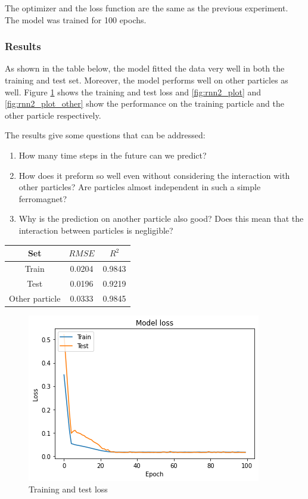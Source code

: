 \documentclass[a4paper]{article}
\begin{document}
  The optimizer and the loss function are the same as the previous experiment. The model was trained for 100 epochs.

  \subsubsection{Results}
  As shown in the table below, the model fitted the data very well in both the training and test set. Moreover, the model performs well on other particles as well. Figure \ref{fig:rnn2_loss} shows the training and test loss and \ref{fig:rnn2_plot} and \ref{fig:rnn2_plot_other} show the performance on the training particle and the other particle respectively.

  The results give some questions that can be addressed:

  \begin{enumerate}
    \item How many time steps in the future can we predict?
    \item How does it preform so well even without considering the interaction with other particles? Are particles almost independent in such a simple ferromagnet?
    \item Why is the prediction on another particle also good? Does this mean that the interaction between particles is negligible?
  \end{enumerate}

  \begin{table}[h!]
    \centering
    \begin{tabular}{|c | c c|} 
     \hline
     Set & $RMSE$ & $R^2$ \\ [0.5ex] 
     \hline\hline
     Train & 0.0204 & 0.9843 \\ 
     Test & 0.0196 & 0.9219 \\
     Other particle & 0.0333 & 0.9845 \\
     \hline
    \end{tabular}
  \end{table}

  \begin{figure}
    \centering
    \includegraphics[scale=0.8]{rnn2_loss.png}
    \caption{Training and test loss}
    \label{fig:rnn2_loss}
  \end{figure}
  
\end{document}
